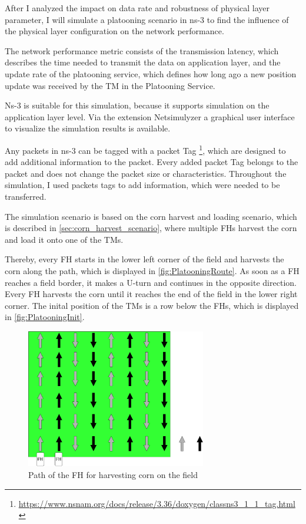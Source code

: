 After I analyzed the impact on data rate and robustness of physical layer parameter, I will simulate a platooning
scenario in ns-3 to find the influence of the physical layer configuration on the network performance.


The network performance metric consists of the transmission latency, which describes the time needed to transmit the data
on application layer, and the update rate of the platooning service, which defines how long ago a new position update
was received by the \ac{TM} in the Platooning Service.

Ns-3 is suitable for this simulation, because it supports simulation on the application layer level.
Via the extension Netsimulyzer a graphical user interface to visualize the simulation results is available.

Any packets in ns-3 can be tagged with a packet Tag \footnote{\url{https://www.nsnam.org/docs/release/3.36/doxygen/classns3_1_1_tag.html}},
which are designed to add additional information to the packet.
Every added packet Tag belongs to the packet and does not change the packet size or characteristics.
Throughout the simulation, I used packets tags to add information, which were needed to be transferred.

The simulation scenario is based on the corn harvest and loading scenario, which is described in \autoref{sec:corn_harvest_scenario}, where
multiple \ac{FH}s harvest the corn and load it onto one of the \ac{TM}s.

Thereby, every \ac{FH} starts in the lower left corner of the field and harvests the corn along the path,
which is displayed in \autoref{fig:PlatooningRoute}.
As soon as a \ac{FH} reaches a field border, it makes a U-turn and continues
in the opposite direction.
Every \ac{FH} harvests the corn until it reaches the end of the field in the lower right corner.
The inital position of the \ac{TM}s is a row below the \ac{FH}s, which is displayed in \autoref{fig:PlatooningInit}.
\begin{figure}[H]%
	\centering
	\includegraphics[width=0.7\textwidth]{figures/drawings-Route}
	\caption{Path of the \acf{FH} for harvesting corn on the field}
	\label{fig:PlatooningRoute}%
\end{figure}

